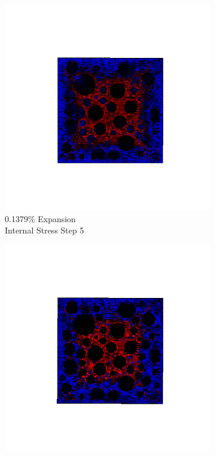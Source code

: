 \begin{figure}[ht!]
\centering
    \begin{subfigure}{.25\textwidth}
      \centering
      \includegraphics[width=1.0\linewidth]{Files/exp_3D/DEF/A30X0C_1_s5.png}
      \caption{0.1379\% Expansion\\Internal Stress Step 5}
    \end{subfigure}%
    \begin{subfigure}{.25\textwidth}
      \centering
      \includegraphics[width=1.0\linewidth]{Files/exp_3D/DEF/A30X0C_1_s10.png}

\end{subfigure}
\end{figure}

